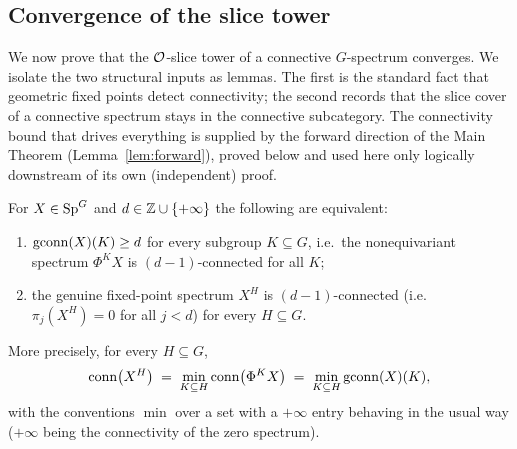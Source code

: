 \subsection*{Convergence of the slice tower}

We now prove that the $\mathcal{O}$-slice tower of a connective $G$-spectrum
converges. We isolate the two structural inputs as lemmas. The first is the
standard fact that geometric fixed points detect connectivity; the second
records that the slice cover of a connective spectrum stays in the connective
subcategory. The connectivity bound that drives everything is supplied by the
forward direction of the Main Theorem (Lemma~\ref{lem:forward}), proved below
and used here only logically downstream of its own (independent) proof.

\begin{qfivelemma}\label{lem:detect-conn}
For $X\in\mathrm{Sp}^G$ and $d\in\mathbb{Z}\cup\{+\infty\}$ the following are equivalent:
\begin{enumerate}\setlength\itemsep{2pt}
\item $\operatorname{gconn}(X)(K)\ge d$ for every subgroup $K\subseteq G$, i.e.\ the
nonequivariant spectrum $\Phi^K X$ is $(d-1)$-connected for all $K$;
\item the genuine fixed-point spectrum $X^H$ is $(d-1)$-connected
(i.e.\ $\pi_j(X^H)=0$ for all $j<d$) for every $H\subseteq G$.
\end{enumerate}
More precisely, for every $H\subseteq G$,
\begin{equation}\label{eq:conn-min}
\operatorname{conn}\bigl(X^H\bigr)\;=\;\min_{K\subseteq H}\operatorname{conn}\bigl(\Phi^K X\bigr)
\;=\;\min_{K\subseteq H}\operatorname{gconn}(X)(K),
\end{equation}
with the conventions $\min$ over a set with a $+\infty$ entry behaving in the
usual way ($+\infty$ being the connectivity of the zero spectrum).
\end{qfivelemma}

